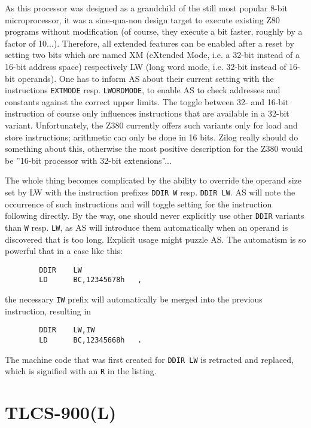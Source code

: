 \documentclass[12pt,twoside]{report}
\newcommand{\tty}[1]{{\tt #1}}
\begin{document}
As this processor was designed as a grandchild of the still most popular
8-bit microprocessor, it was a sine-qua-non design target to execute
existing Z80 programs without modification (of course, they execute a bit
faster, roughly by a factor of 10...).  Therefore, all extended features
can be enabled after a reset by setting two bits which are named XM
(eXtended Mode, i.e. a 32-bit instead of a 16-bit address space)
respectively LW (long word mode, i.e. 32-bit instead of 16-bit operands). 
One has to inform AS about their current setting with the instructions
\tty{EXTMODE} resp. \tty{LWORDMODE}, to enable AS to check addresses and
constants against the correct upper limits.  The toggle between 32- and
16-bit instruction of course only influences instructions that are
available in a 32-bit variant.  Unfortunately, the Z380 currently offers
such variants only for load and store instructions; arithmetic can only be
done in 16 bits.  Zilog really should do something about this, otherwise
the most positive description for the Z380 would be ''16-bit processor
with 32-bit extensions''...

The whole thing becomes complicated by the ability to override the operand
size set by LW with the instruction prefixes \tty{DDIR W} resp.
\tty{DDIR LW}.  AS will note the occurrence of such instructions and will
toggle setting for the instruction following directly.  By the way, one
should never explicitly use other \tty{DDIR} variants than \tty{W} resp.
\tty{LW}, as AS will introduce them automatically when an operand is
discovered that is too long.  Explicit usage might puzzle AS.  The
automatism is so powerful that in a case like this:
\begin{verbatim}
        DDIR    LW
        LD      BC,12345678h   ,
\end{verbatim}
the necessary \tty{IW} prefix will automatically be merged into the previous
instruction, resulting in
\begin{verbatim}
        DDIR    LW,IW
        LD      BC,12345668h   .
\end{verbatim}
The machine code that was first created for \tty{DDIR LW} is retracted and
replaced, which is signified with an \tty{R} in the listing.


\section{TLCS-900(L)}
\label{TLCS900Spec}
\end{document}
